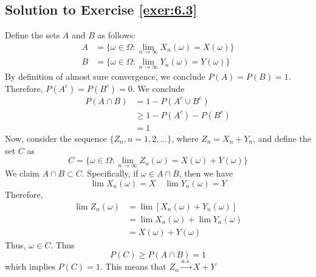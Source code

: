 \documentclass[12pt]{book}
\numberwithin{equation}{chapter}
\theoremstyle{plain}
\numberwithin{theorem}{section}
\theoremstyle{definition}
\numberwithin{exercise}{chapter}
\newcommand{\<}{\langle}
\renewcommand{\>}{\rangle}
\renewcommand{\(}{\left(}
\renewcommand{\)}{\right)}
\renewcommand{\[}{\left[}
\renewcommand{\]}{\right]}
\begin{document}
\subsection*{Solution to Exercise \ref{exer:6.3}}
Define the sets $A$ and $B$ as follows:
\begin{align}
 A &= \{ \omega \in \Omega : \lim_{n \rightarrow \infty}X_n(\omega) = X(\omega)  \}\\
 B &= \{ \omega\in \Omega : \lim_{n \rightarrow \infty}Y_n(\omega) = Y(\omega) \}
\end{align}
By definition of almost sure convergence, we conclude $P(A) = P(B) = 1$. Therefore, $P(A^c) = P(B^c) = 0$. We conclude
\begin{align}
 P(A \cap B) &= 1 - P(A^c \cup B^c) \\
                   &\geq 1 - P(A^c) - P(B^c)\\
                   &= 1 
\end{align}
Now, consider the sequence $\{ Z_n, n=1,2,... \}$, where $Z_n = X_n + Y_n$, and define the set $C$ as
$$C = \{  \omega \in \Omega : \lim_{n\rightarrow \infty} Z_n(\omega) = X(\omega) + Y(\omega)   \} $$
We claim $A \cap B \subset C$. Specifically, if $\omega \in A \cap B$, then we have 
$$ \lim X_n(\omega) = X  \quad  \lim Y_n(\omega) =Y $$
Therefore, 
\begin{align}
 \lim Z_n(\omega) &= \lim [ X_n(\omega) + Y_n(\omega) ] \\
                  &= \lim X_n(\omega) + \lim Y_n(\omega) \\
                  &= X(\omega) + Y(\omega)
\end{align}
Thus, $\omega\in C$. Thus
$$ P(C) \geq P(A \cap B) =1 $$
which implies $P(C) = 1$. This means that $Z_n  \stackrel{a.s.}{\rightarrow} X+Y $
\end{document}
